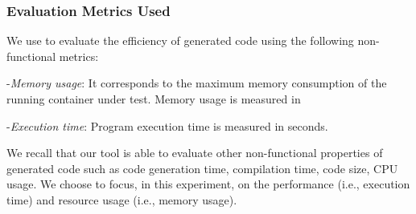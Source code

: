 \begin{table}[h]
	\centering
		\caption{Description of selected benchmark libraries}
		\label{my-label}
\end{table}

\subsubsection{Evaluation Metrics Used}
We use to evaluate the efficiency of generated code using the following non-functional metrics:

-\textit{Memory usage}:
It corresponds to the maximum memory consumption of the running container under test. Memory usage is measured in \SI{}{\mega\byte}

-\textit{Execution time}:
Program execution time is measured in seconds.

We recall that our tool is able to evaluate other non-functional properties of generated code such as code generation time, compilation time, code size, CPU usage. We choose to focus, in this experiment, on the performance (i.e., execution time) and resource usage (i.e., memory usage).
 
